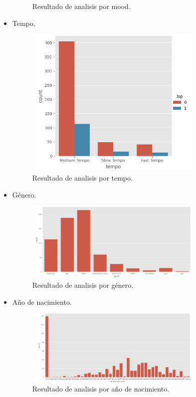 \documentclass[a4paper,12pt]{article}
\begin{document}
\begin{itemize}
\begin{figure}[H]
        \caption{Resultado de analisis por mood.}
        \label{fig:decision_tree}
    \end{figure}
    \item Tempo.
    \begin{figure}[H]
        \centering
        \includegraphics[width=0.8\textwidth]{9.png}
        \caption{Resultado de analisis por tempo.}
        \label{fig:decision_tree}
    \end{figure}
    \item Género.
    \begin{figure}[H]
        \centering
        \includegraphics[width=0.8\textwidth]{10.png}
        \caption{Resultado de analisis por género.}
        \label{fig:decision_tree}
    \end{figure}
    \item Año de nacimiento.
    \begin{figure}[H]
        \centering
        \includegraphics[width=0.8\textwidth]{11.png}
        \caption{Resultado de analisis por año de nacimiento.}
        \label{fig:decision_tree}
    \end{figure}
\end{itemize}
\end{document}
